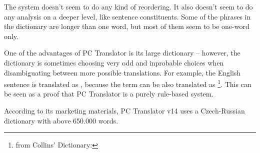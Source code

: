The system doesn't seem to do any kind of reordering. It also doesn't seem to do any analysis on a deeper level, like sentence constituents. Some of the phrases in the dictionary are longer than one word, but most of them seem to be one-word only.

One of the advantages of PC Translator is its large dictionary -- however, the dictionary is sometimes choosing very odd and inprobable choices when disambiguating between more possible translations. For example, the English sentence  is translated as , because the term  can be also translated as \footnote{from Collins' Dictionary: }. This can be seen as a proof that PC Translator is a purely rule-based system.

According to its marketing materials, PC Translator v14 uses a Czech-Russian dictionary with above 650.000 words.

